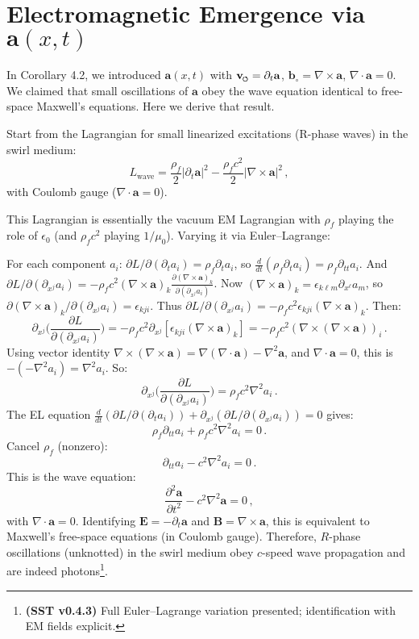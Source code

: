 \documentclass[reprint,aps,onecolumn,nofootinbib]{revtex4-2}
\newcommand{\swirlarrow}{%
    \mathchoice{\mkern-2mu\scriptstyle\boldsymbol{\circlearrowleft}}%
    {\mkern-2mu\scriptstyle\boldsymbol{\circlearrowleft}}%
    {\mkern-2mu\scriptscriptstyle\boldsymbol{\circlearrowleft}}%
    {\mkern-2mu\scriptscriptstyle\boldsymbol{\circlearrowleft}}%
}
\newcommand{\vswirl}{\mathbf{v}_{\swirlarrow}}
\begin{document}
\section{Electromagnetic Emergence via $\mathbf{a}(x,t)$}
    In Corollary 4.2, we introduced $\mathbf{a}(x,t)$ with $\vswirl = \partial_t \mathbf{a}$, $\mathbf{b}_{\circ} = \nabla \times \mathbf{a}$, $\nabla \cdot \mathbf{a}=0$. We claimed that small oscillations of $\mathbf{a}$ obey the wave equation identical to free-space Maxwell’s equations. Here we derive that result.

    Start from the Lagrangian for small linearized excitations (R-phase waves) in the swirl medium:
    \[
        L_{\text{wave}} = \frac{\rho_f}{2}|\partial_t \mathbf{a}|^2 - \frac{\rho_f c^2}{2}|\nabla \times \mathbf{a}|^2\,,
    \]
    with Coulomb gauge ($\nabla \cdot \mathbf{a}=0$).

    This Lagrangian is essentially the vacuum EM Lagrangian with $\rho_f$ playing the role of $\epsilon_0$ (and $\rho_f c^2$ playing $1/\mu_0$). Varying it via Euler–Lagrange:

    For each component $a_i$: $\partial L/\partial(\partial_t a_i) = \rho_f \partial_t a_i$, so $\frac{d}{dt}(\rho_f \partial_t a_i) = \rho_f \partial_{tt} a_i$. And $\partial L/\partial(\partial_{x^j} a_i) = -\rho_f c^2 (\nabla \times \mathbf{a})_k \frac{\partial (\nabla \times \mathbf{a})_k}{\partial(\partial_{x^j}a_i)}$. Now $(\nabla \times \mathbf{a})_k = \epsilon_{k\ell m}\partial_{x^\ell} a_m$, so $\partial(\nabla \times \mathbf{a})_k/\partial(\partial_{x^j}a_i) = \epsilon_{kji}$. Thus $\partial L/\partial(\partial_{x^j} a_i) = -\rho_f c^2 \epsilon_{kji}(\nabla \times \mathbf{a})_k$. Then:
    \[
        \partial_{x^j}\Big(\frac{\partial L}{\partial(\partial_{x^j} a_i)}\Big) = -\rho_f c^2 \partial_{x^j}[\epsilon_{kji}(\nabla \times \mathbf{a})_k] = -\rho_f c^2 (\nabla \times (\nabla \times \mathbf{a}))_i\,.
    \]
    Using vector identity $\nabla \times (\nabla \times \mathbf{a}) = \nabla(\nabla\cdot\mathbf{a}) - \nabla^2 \mathbf{a}$, and $\nabla\cdot\mathbf{a}=0$, this is $-(-\nabla^2 a_i) = \nabla^2 a_i$. So:
    \[
        \partial_{x^j}\Big(\frac{\partial L}{\partial(\partial_{x^j} a_i)}\Big) = \rho_f c^2 \nabla^2 a_i\,.
    \]
    The EL equation $\frac{d}{dt}(\partial L/\partial(\partial_t a_i)) + \partial_{x^j}(\partial L/\partial(\partial_{x^j}a_i))=0$ gives:
    \[
        \rho_f \partial_{tt} a_i + \rho_f c^2 \nabla^2 a_i = 0\,.
    \]
    Cancel $\rho_f$ (nonzero):
    \[
        \partial_{tt} a_i - c^2 \nabla^2 a_i = 0\,.
    \]
    This is the wave equation:
    \[
        \frac{\partial^2 \mathbf{a}}{\partial t^2} - c^2 \nabla^2 \mathbf{a} = 0\,,
    \]
    with $\nabla\cdot\mathbf{a}=0$. Identifying $\mathbf{E} = -\partial_t \mathbf{a}$ and $\mathbf{B}=\nabla\times\mathbf{a}$, this is equivalent to Maxwell’s free-space equations (in Coulomb gauge). Therefore, $R$-phase oscillations (unknotted) in the swirl medium obey $c$-speed wave propagation and are indeed photons\footnote{\textbf{(SST v0.4.3)} Full Euler–Lagrange variation presented; identification with EM fields explicit.}.
\end{document}
